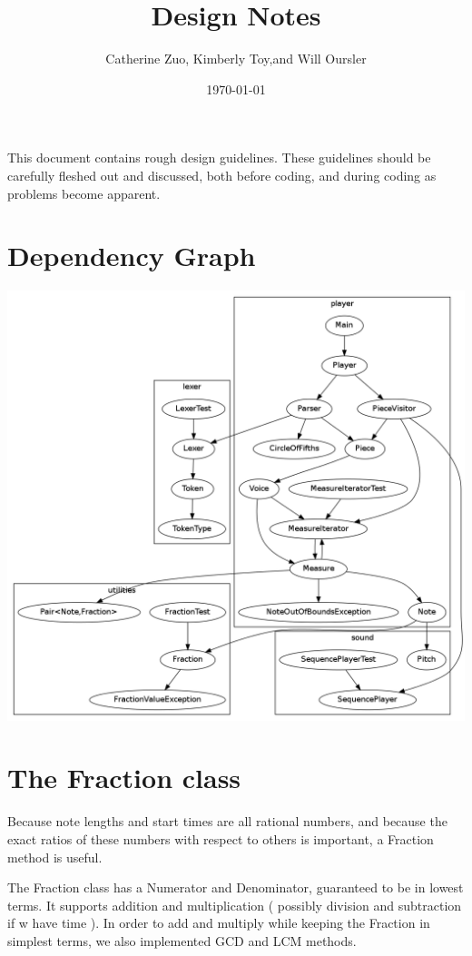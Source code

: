 \documentclass{amsart}
\begin{document}
\author{ Catherine Zuo, Kimberly Toy,and Will Oursler}
\title{Design Notes}
\date{\today}
\maketitle

This document contains rough design guidelines. These guidelines should be carefully fleshed out and discussed, both before coding, and during coding as problems become apparent.

\section{ Dependency Graph }

\includegraphics[width=\linewidth]{classes.png}

\section{ The Fraction class }

Because note lengths and start times are all rational numbers, and because the exact ratios of these numbers with respect to others is important, a Fraction method is useful.

The Fraction class has a Numerator and Denominator, guaranteed to be in lowest terms. It supports addition and multiplication ( possibly division and subtraction if w have time ).  In order to add and multiply while keeping the Fraction in simplest terms, we also implemented GCD and LCM methods.  
\end{document}
